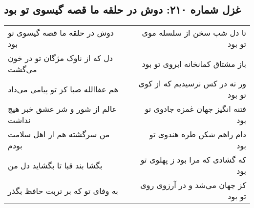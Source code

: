 \begin{center}
\section*{غزل شماره ۲۱۰: دوش در حلقه ما قصه گیسوی تو بود}
\label{sec:sh210}
\begin{longtable}{l p{0.5cm} r}
دوش در حلقه ما قصه گیسوی تو بود
&&
تا دل شب سخن از سلسله موی تو بود
\\
دل که از ناوک مژگان تو در خون می‌گشت
&&
باز مشتاق کمانخانه ابروی تو بود
\\
هم عفاالله صبا کز تو پیامی می‌داد
&&
ور نه در کس نرسیدیم که از کوی تو بود
\\
عالم از شور و شر عشق خبر هیچ نداشت
&&
فتنه انگیز جهان غمزه جادوی تو بود
\\
من سرگشته هم از اهل سلامت بودم
&&
دام راهم شکن طره هندوی تو بود
\\
بگشا بند قبا تا بگشاید دل من
&&
که گشادی که مرا بود ز پهلوی تو بود
\\
به وفای تو که بر تربت حافظ بگذر
&&
کز جهان می‌شد و در آرزوی روی تو بود
\\
\end{longtable}
\end{center}
